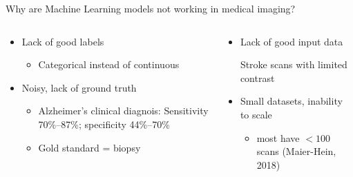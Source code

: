 \documentclass[8pt,xcolor=table]{beamer}
\begin{document}
\begin{frame}{Why are Machine Learning models not working in medical imaging?}

\vspace{-4em}


\begin{columns}[t]
\begin{column}{0.5\textwidth}
\centering

\begin{itemize}
\item Lack of good labels
\begin{itemize}
 \item Categorical instead of continuous
\end{itemize}

 \vspace{2em}
 
 \item Noisy, lack of ground truth
\begin{itemize}
    \item Alzheimer's clinical diagnois: Sensitivity 70\%--87\%; specificity 44\%--70\%  
    \item Gold standard = biopsy
\end{itemize}
\vo 



\end{itemize}


\end{column}
\begin{column}{0.5\textwidth}
\centering

\begin{itemize}
\item Lack of good input data

Stroke scans with limited contrast

\vspace{2em}

\item Small datasets, inability to scale 

\begin{itemize}
\item most have  $<100$ scans (Maier-Hein, 2018)
\end{itemize}


\end{itemize}


\end{column}
\end{columns}

 
 
\end{frame}
\end{document}

